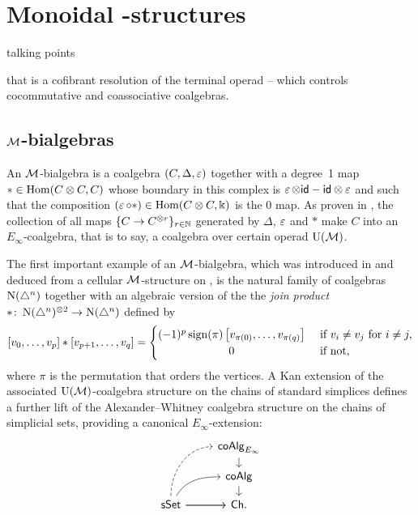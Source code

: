 
\section{Monoidal \pdfEinfty-structures}

talking points

that is a cofibrant resolution of the terminal operad -- which controls cocommutative and coassociative coalgebras.

\subsection{$\mathcal{M}$-bialgebras}

An $\mathcal{M}$-bialgebra is a coalgebra $(C, \Delta, \operatorname{\varepsilon})$ together with a degree~1 map $\ast \in \mathrm{Hom}(C \otimes C, C)$ whose boundary in this complex is $\operatorname{\varepsilon} \otimes \mathsf{id} - \mathsf{id} \otimes \operatorname{\varepsilon}$ and such that the composition $(\operatorname{\varepsilon} \circ \ast) \in \mathrm{Hom}(C \otimes C, \Bbbk)$ is the $0$ map.
As proven in \cite{medina2020prop1}, the collection of all maps $\{C \to C^{\otimes r}\}_{r \in \mathbb{N}}$ generated by $\Delta$, $\operatorname{\varepsilon}$ and $\ast$ make $C$ into an $E_\infty$-coalgebra, that is to say, a coalgebra over certain operad ${\operatorname{U}(\mathcal{M})}$.

The first important example of an $\mathcal{M}$-bialgebra, which was introduced in \cite{medina2020prop1} and deduced from a cellular $\mathcal{M}$-structure on \cite{medina2021prop2}, is the natural family of coalgebras $\operatorname{N}(\triangle^n)$ together with an algebraic version of the the \textit{join product} $\ast \colon \operatorname{N}(\triangle^n)^{\otimes 2} \to \operatorname{N}(\triangle^n)$ defined by
\begin{equation*}
	\left[v_0, \dots, v_p \right] \ast \left[v_{p+1}, \dots, v_q\right] =
	\begin{cases} (-1)^{p} \sign(\pi) \left[v_{\pi(0)}, \dots, v_{\pi(q)}\right] &
		\text{ if } v_i \neq v_j \text{ for } i \neq j, \\
		\hfil 0 & \text{ if not},
	\end{cases}
\end{equation*}
where $\pi$ is the permutation that orders the vertices.
A Kan extension of the associated ${\operatorname{U}(\mathcal{M})}$-coalgebra structure on the chains of standard simplices defines a further lift of the Alexander--Whitney coalgebra structure on the chains of simplicial sets, providing a canonical $E_\infty$-extension:
\begin{equation*}
	\begin{tikzcd}[column sep=normal, row sep=small]
		& \coAlg_{E_\infty} \arrow[d] \\
		& \coAlg \arrow[d] \\
		\sSet \arrow[uur, dashed, out=90, in=180] \arrow[r]
		\arrow[ur,out=60, in=180, near end]
		\arrow[r]
		& \Ch.
	\end{tikzcd}
\end{equation*}

